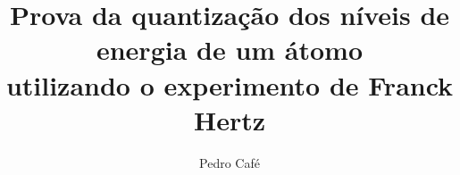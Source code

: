 \documentclass[aps,twocolumn,preprintnumbers]{revtex4-1}
\begin{document}
\title{Prova da quantização dos níveis de energia de um átomo \\utilizando o experimento de Franck Hertz}
\author{Pedro Café}



\maketitle 










\nocite{*}
\end{document}
